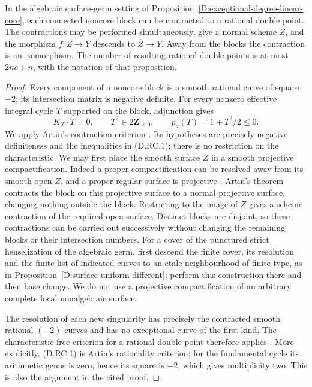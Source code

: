 \begin{proposition}
\label{D:contract-zero-cost-blocks}
In the algebraic surface-germ setting of
Proposition~\ref{D:exceptional-degree-linear-core}, each connected
noncore block can be contracted to a rational double point.  The
contractions may be performed simultaneously, give a normal scheme
\(\overline Z\), and the morphism \(f:Z\to Y\) descends to
\(\overline Z\to Y\).  Away from the blocks the contraction is an
isomorphism.  The number of resulting rational double points is at
most \(2nc+n\), with the notation of that proposition.
\end{proposition}
\begin{proof}
Every component of a noncore block is a smooth rational curve of
square \(-2\); its intersection matrix is negative definite.
For every nonzero effective integral cycle \(T\) supported on the
block, adjunction gives
\[
 K_Z\cdot T=0,\qquad T^2\in2\mathbf Z_{<0},\qquad
                    p_a(T)=1+T^2/2\le0.                 \tag{D.RC.1}
\]
We apply Artin's contraction criterion
\citep[Theorem~2.3 and its full proof; published Russian
translation, pp.~9--10]{Artin1962D}.  Its hypotheses are precisely
negative definiteness and the inequalities in (D.RC.1); there is no
restriction on the characteristic.  We may first place the smooth
surface \(Z\) in a smooth projective compactification.  Indeed a
proper compactification can be resolved away from its smooth open
\(Z\), and a proper regular surface is projective
\citep[Lemma~54.16.11, tag~0C5P]{StacksDSurfaceResolution}.
Artin's theorem contracts the block on this projective surface to a
normal projective surface, changing nothing outside the block.
Restricting to the image of \(Z\) gives a scheme contraction of the
required open surface.  Distinct blocks are disjoint, so these
contractions can be carried out successively without changing the
remaining blocks or their intersection numbers.
For a cover of the punctured strict henselization of the algebraic
germ, first descend the finite cover, its resolution and the finite
list of indicated curves to an etale neighbourhood of finite type,
as in Proposition~\ref{D:surface-uniform-different}; perform this
construction there and then base change.  We do not use a projective
compactification of an arbitrary complete local nonalgebraic surface.

The resolution of each new singularity has precisely the contracted
smooth rational \((-2)\)-curves and has no exceptional curve of the
first kind.  The characteristic-free criterion for a rational
double point therefore applies
\citep[Proposition~0.4.8 and proof, author's April~2024 text,
p.~69]{C_Enriques2025}.  More explicitly, (D.RC.1) is Artin's
rationality criterion; for the fundamental cycle its arithmetic
genus is zero, hence its square is \(-2\), which gives multiplicity
two.  This is also the argument in the cited proof.


\end{proof}
